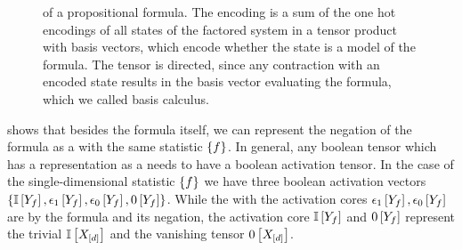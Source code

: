 \begin{figure}[t]
    \begin{center}
        
    \end{center}
    \caption{\BasisEncoding{} of a propositional formula.
    The encoding is a sum of the one hot encodings of all states of the factored system in a tensor product with basis vectors, which encode whether the state is a model of the formula.
    The tensor is directed, since any contraction with an encoded state results in the basis vector evaluating the formula, which we called basis calculus.
    }
    \label{fig:formulabencoding}
\end{figure}




 shows that besides the formula itself, we can represent the negation of the formula as a \ComputationActivationNetwork{} with the same statistic $\{f\}$.
In general, any boolean tensor which has a representation as a \ComputationActivationNetwork{} needs to have a boolean activation tensor.
In the case of the single-dimensional statistic $\{f\}$ we have three boolean activation vectors $\{\mathbb{I}\left[Y_{f}\right],\epsilon_1\left[Y_{f}\right],\epsilon_0\left[Y_{f}\right],0\left[Y_{f}\right]\}$.
While the \ComputationActivationNetworks{} with the activation cores $\epsilon_1\left[Y_{f}\right],\epsilon_0\left[Y_{f}\right]$ are by  the formula and its negation, the activation core $\mathbb{I}\left[Y_{f}\right]$ and $0\left[Y_{f}\right]$ represent the trivial $\mathbb{I}\left[X_{[d]}\right]$ and the vanishing tensor $0\left[X_{[d]}\right]$.

